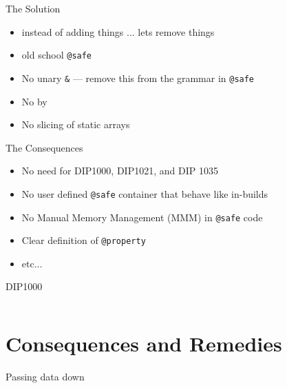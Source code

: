 \documentclass[aspectratio=169,notes]{beamer}
\begin{document}
	\begin{frame}[fragile]{The Solution}
		\begin{itemize}
			\item instead of adding things ... lets remove things\vspace{1cm}
			\pause
			\item old school \lstinline|@safe|
			\item No unary \lstinline|&| --- remove this from the grammar in \lstinline|@safe|
			\item No \lstinline@return@ by \lstinline@ref@
			\item No slicing of static arrays
		\end{itemize}
	\end{frame}

	\begin{frame}[fragile]{The Consequences}
		\begin{itemize}
			\item No need for DIP1000, DIP1021, and DIP 1035
			\item No user defined \lstinline|@safe| container that behave like in-builds
			\item No Manual Memory Management (MMM) in \lstinline|@safe| code
			\item Clear definition of \lstinline|@property|
			\item etc...
		\end{itemize}
	\end{frame}

	\begin{frame}[fragile]{DIP1000}
		\begin{columns}[T]
		\begin{column}{0.49\textwidth}
		
		\end{column}
		\begin{column}{0.49\textwidth}
		
		\end{column}
		\end{columns}
	\end{frame}

	\section{Consequences and Remedies}

	\begin{frame}[fragile]{Passing data down}
		\begin{columns}[T]
		\begin{column}{0.49\textwidth}
		
		\end{column}
		\pause
		\begin{column}{0.49\textwidth}
		
		\end{column}
		\end{columns}
	\end{frame}
\end{document}
